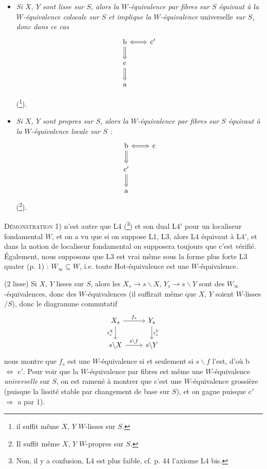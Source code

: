 \documentclass[11pt]{article}
\newcommand{\printedpage}[1]{\marginpar{\footnotesize p.~#1}}
\newcommand{\msp}[1]{\marginpar{\footnotesize [#1]}}
\begin{document}
\begin{itemize}
\item[(2 lisse)] \msp{page 42}\textit{Si $X$, $Y$ sont lisse sur $S$, alors la $W$-équivalence par fibres sur $S$ équivaut à la $W$-équivalence colocale sur $S$ et implique la $W$-équivalence} universelle \textit{sur $S$, donc dans ce cas} %
\[
\begin{tikzcd}
\text{b} \arrow[r, Leftrightarrow] \arrow[d, Rightarrow] & \text{c}' \\
\text{c} \arrow[d, Rightarrow] & \\
\text{a} &
\end{tikzcd}
\]

\printedpage{26}
(\footnote[23]{il suffit même $X$, $Y$ $W$-lisses sur $S$.}).

\item[(2 prop)] \textit{Si $X$, $Y$ sont propres sur $S$, alors la $W$-équivalence par fibres sur $S$ équivaut à la $W$-équivalence locale sur $S$ :}
\[
\begin{tikzcd}
\text{b} \arrow[r, Leftrightarrow] \arrow[d, Rightarrow] & \text{c} \\
\text{c}' \arrow[d, Rightarrow] & \\
\text{a} &
\end{tikzcd}
\]
(\footnote[24]{Il suffit même $X$, $Y$ $W$-propres sur $S$.}).
\end{itemize}

\textsc{Démonstration} 1) n'est autre que L4 (\footnote[25]{Non, il y a confusion, L4 est plus faible, cf. p. 44 l'axiome L4 bis.}) et son dual L4$'$ pour un localiseur fondamental $W$, et on a vu que si on suppose L1, L3, alors L4 équivaut à L4$'$, et dans la notion de localiseur fondamental on supposera toujours que c'est vérifié. Également, nous supposons que L3 est vrai même sous la forme plus forte L3 quater (p. 1) : $W_\infty \subseteq W$, i.e. toute Hot-équivalence est une $W$-équivalence.

(2 lisse) Si $X$, $Y$ lisses sur $S$, alors les $X_s \longrightarrow s\backslash X$, $Y_s \longrightarrow s\backslash Y$ sont des $W_\infty$-équivalences, donc des $W$-équivalences (il suffirait même que $X$, $Y$ soient $W$-lisses$/S$), donc le diagramme commutatif
\[
\begin{tikzcd}
X_s \arrow[r, "f_s"] \arrow[d, "i_s^X"'] & Y_s \arrow[d, "i_s^Y"] \\
s\backslash X \arrow[r, "s\backslash f"] & s\backslash Y
\end{tikzcd}
\]
nous montre que $f_s$ est une $W$-équivalence si et seulement si $s\backslash f$ l'est, d'où b $\Longleftrightarrow$ c$'$. Pour voir que la $W$-équivalence par fibres est même une $W$-équivalence \textit{universelle} sur $S$, on est ramené à montrer que c'est une $W$-équivalence grossière (puisque la lissité stable par changement de base sur $S$), et on gagne puisque c$'$ $\Longrightarrow$ a par 1).
\end{document}
